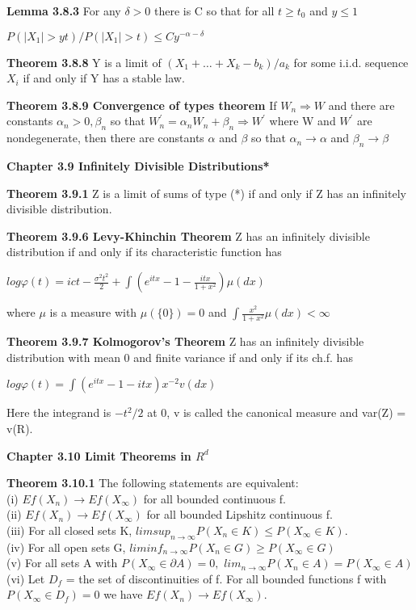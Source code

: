 \documentclass{article}
\begin{document}
\textbf {Lemma 3.8.3} For any $\delta > 0$ there is C so that for all $t \geq t_0$ and $y \leq 1$ \\
\begin{center}
$P(|X_1|>yt)/P(|X_1| > t) \leq Cy^{-\alpha - \delta}$
\end{center}

\textbf {Theorem 3.8.8} Y is a limit of $(X_1 + \dots + X_k - b_k) /a_k$ for some i.i.d. sequence $X_i$ if and only if Y has a stable law.

\textbf {Theorem 3.8.9 Convergence of types theorem} If $W_n \Rightarrow W$ and there are constants $\alpha_n > 0, \beta_n$ so that $W_n^{'} = \alpha_n W_n + \beta_n \Rightarrow W^{'}$ where W and $W^{'}$ are nondegenerate, then there are constants $\alpha$ and $\beta$ so that $\alpha_n \rightarrow \alpha$ and $\beta_n \to \beta$

\textbf {Chapter 3.9 Infinitely Divisible Distributions*}

\textbf {Theorem 3.9.1} Z is a limit of sums of type (*) if and only if Z has an infinitely divisible distribution.

\textbf {Theorem 3.9.6 Levy-Khinchin Theorem} Z has an infinitely divisible distribution if and only if its characteristic function has 
\begin{center}
$log \varphi(t) = ict - \frac{\sigma^2 t^2}{2} + \int (e^{itx} - 1 - \frac{itx}{1+x^2}) \mu(dx)$
\end{center}
where $\mu$ is a measure with $\mu(\{0\}) = 0$ and $\int \frac{x^2}{1+x^2} \mu(dx) < \infty$

\textbf {Theorem 3.9.7 Kolmogorov's Theorem} Z has an infinitely divisible distribution with mean 0 and finite variance if and only if its ch.f. has 
\begin{center}
$log \varphi(t) = \int (e^{itx} - 1 - itx) x^{-2} v (dx)$
\end{center}
Here the integrand is $-t^2 / 2$ at 0, v is called the canonical measure and var(Z) = v(R).

\textbf {Chapter 3.10 Limit Theorems in $R^d$}

\textbf {Theorem 3.10.1} The following statements are equivalent:  \\
(i) $Ef(X_n) \to Ef(X_\infty)$ for all bounded continuous f. \\
(ii) $Ef(X_n) \to Ef(X_\infty)$ for all bounded Lipshitz continuous f. \\
(iii) For all closed sets K, $limsup_{n \to \infty} P(X_n \in K) \leq P(X_\infty \in K)$. \\
(iv) For all open sets G, $liminf_{n \to \infty} P(X_n \in G) \geq P(X_\infty \in G)$ \\
(v) For all sets A with $P(X_\infty \in \partial A) = 0,$ $lim_{n \to \infty} P(X_n \in A) = P(X_\infty \in A)$ \\
(vi) Let $D_f$ = the set of discontinuities of f. For all bounded functions f with $P(X_\infty \in D_f) = 0$ we have $Ef(X_n) \to Ef(X_\infty)$.
\end{document}
